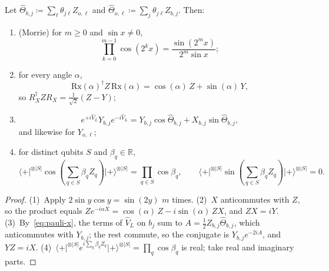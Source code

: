 \documentclass[11pt,a4paper]{article}
\theoremstyle{plain}
\theoremstyle{definition}
\theoremstyle{remark}
\newcommand{\R}{\mathbb{R}}
\newcommand{\ket}[1]{\lvert#1\rangle}
\newcommand{\bra}[1]{\langle#1\rvert}
\begin{document}
\begin{lemma}\label{lem:identities}
  Let \( \hat{\Theta}_{b,j} \coloneqq \sum_{\ell} \theta_{j\ell} Z_{o,\ell} \) and
  \( \hat{\Theta}_{o,\ell} \coloneqq \sum_{j} \theta_{j\ell} Z_{b,j} \). Then:
  \begin{enumerate}
    \item (Morrie) for \( m \ge 0 \) and \( \sin x \neq 0 \),
      \begin{equation}\label{eq:morrie}
        \prod_{k=0}^{m-1} \cos(2^k x) = \frac{\sin(2^m x)}{2^m \sin x};
      \end{equation}
    \item for every angle \( \alpha \),
      \begin{equation}\label{eq:heis-rx}
        {\mathrm{Rx}(\alpha)}^\dagger Z\, \mathrm{Rx}(\alpha) = \cos(\alpha)\, Z + \sin(\alpha)\, Y,
      \end{equation}
      so \( R_X^\dagger Z R_X = \frac{1}{\sqrt{2}}(Z - Y) \);
    \item
      \begin{equation}\label{eq:heis-vl}
        e^{+i\hat{V}_L} Y_{b,j} e^{-i\hat{V}_L} = Y_{b,j}\cos\hat{\Theta}_{b,j} +
        X_{b,j}\sin\hat{\Theta}_{b,j},
      \end{equation}
      and likewise for \( Y_{o,\ell} \);
    \item for distinct qubits \( S \) and \( \beta_q \in \R \),
      \begin{equation}\label{eq:trig-plus-exp}
        \bra{+}^{\otimes \lvert S \rvert} \cos\left(\sum_{q \in S} \beta_q Z_q\right)
        \ket{+}^{\otimes \lvert S \rvert} = \prod_{q \in S} \cos\beta_q, \qquad
        \bra{+}^{\otimes \lvert S \rvert} \sin\left(\sum_{q \in S} \beta_q Z_q\right)
        \ket{+}^{\otimes \lvert S \rvert} = 0.
      \end{equation}
  \end{enumerate}
\end{lemma}
\begin{proof}
  (1)~Apply \( 2\sin y\cos y = \sin(2y) \) \( m \) times.
  (2)~\( X \) anticommutes with \( Z \), so the product equals
  \( Z e^{-i\alpha X} = \cos(\alpha)\, Z - i\sin(\alpha)\, ZX \), and \( ZX = iY \).
  (3)~By~\eqref{eq:pauli-x}, the terms of \( \hat{V}_L \) on \( b_j \) sum to
  \( A = \frac{1}{2} Z_{b,j} \hat{\Theta}_{b,j} \), which anticommutes with \( Y_{b,j} \); the
  rest commute, so the conjugate is \( Y_{b,j} e^{-2iA} \), and \( YZ = iX \).
  (4)~\( \bra{+}^{\otimes \lvert S \rvert} e^{i\sum_q \beta_q Z_q} \ket{+}^{\otimes \lvert S \rvert}
  = \prod_q \cos\beta_q \) is real; take real and imaginary parts.
\end{proof}
\end{document}
